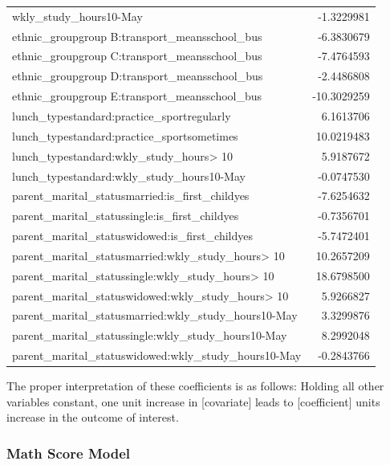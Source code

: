 \documentclass[
]{article}
\begin{document}
\begin{longtable}[]{@{}lr@{}}
wkly\_study\_hours10-May & -1.3229981 \\
ethnic\_groupgroup B:transport\_meansschool\_bus & -6.3830679 \\
ethnic\_groupgroup C:transport\_meansschool\_bus & -7.4764593 \\
ethnic\_groupgroup D:transport\_meansschool\_bus & -2.4486808 \\
ethnic\_groupgroup E:transport\_meansschool\_bus & -10.3029259 \\
lunch\_typestandard:practice\_sportregularly & 6.1613706 \\
lunch\_typestandard:practice\_sportsometimes & 10.0219483 \\
lunch\_typestandard:wkly\_study\_hours\textgreater{} 10 & 5.9187672 \\
lunch\_typestandard:wkly\_study\_hours10-May & -0.0747530 \\
parent\_marital\_statusmarried:is\_first\_childyes & -7.6254632 \\
parent\_marital\_statussingle:is\_first\_childyes & -0.7356701 \\
parent\_marital\_statuswidowed:is\_first\_childyes & -5.7472401 \\
parent\_marital\_statusmarried:wkly\_study\_hours\textgreater{} 10 &
10.2657209 \\
parent\_marital\_statussingle:wkly\_study\_hours\textgreater{} 10 &
18.6798500 \\
parent\_marital\_statuswidowed:wkly\_study\_hours\textgreater{} 10 &
5.9266827 \\
parent\_marital\_statusmarried:wkly\_study\_hours10-May & 3.3299876 \\
parent\_marital\_statussingle:wkly\_study\_hours10-May & 8.2992048 \\
parent\_marital\_statuswidowed:wkly\_study\_hours10-May & -0.2843766 \\
\end{longtable}

The proper interpretation of these coefficients is as follows: Holding
all other variables constant, one unit increase in {[}covariate{]} leads
to {[}coefficient{]} units increase in the outcome of interest.

\subsubsection{Math Score Model}\label{math-score-model}
\end{document}
